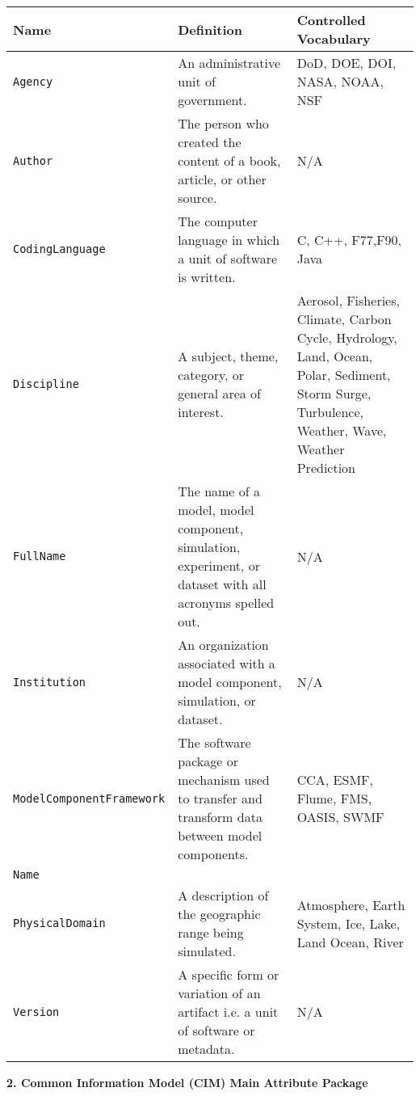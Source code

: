 \begin{tabular}{|p{8cm}|p{20cm}|p{10cm}}
     \hline\hline
     {\bf Name} & {\bf Definition} & {\bf Controlled Vocabulary}\\
     \hline\hline
     {\tt Agency} & An administrative unit of government.& DoD, DOE, DOI, NASA, NOAA, NSF\\
     {\tt Author} & The person who created the content of a book, article, or other source. & N/A\\
     {\tt CodingLanguage} & The computer language in which a unit of software is written. & C, C++, F77,F90, Java\\
     {\tt Discipline} & A subject, theme, category, or general area of interest.& Aerosol, Fisheries, Climate, Carbon Cycle, Hydrology, Land, Ocean, Polar, Sediment, Storm Surge, Turbulence, Weather, Wave, Weather Prediction \\
     {\tt FullName} & The name of a model, model component, simulation, experiment, or dataset with all acronyms spelled out.& N/A\\
     {\tt Institution} & An organization associated with a model component, simulation, or dataset.& N/A\\
     {\tt ModelComponentFramework} & The software package or mechanism used to transfer and transform data between model components.& CCA, ESMF, Flume, FMS, OASIS, SWMF \\
     {\tt Name} & \\
     {\tt PhysicalDomain} & A description of the geographic range being simulated. & Atmosphere, Earth System, Ice, Lake, Land Ocean, River\\
     {\tt Version} & A specific form or variation of an artifact i.e. a unit of software or metadata. & N/A\\ 
\end{tabular}



\vspace{.25in}


{\bf 2. Common Information Model (CIM) Main Attribute Package}

